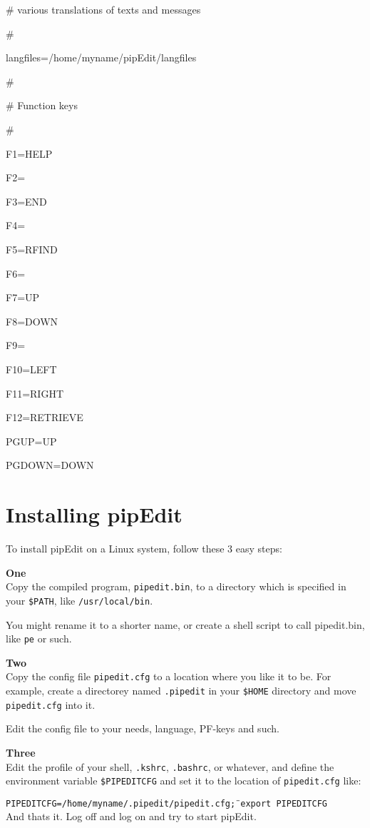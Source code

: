 \documentclass{report}
\begin{document}
\# various translations of texts and messages

\#

langfiles=/home/myname/pipEdit/langfiles

\#

\# Function keys

\#

F1=HELP

F2=

F3=END

F4=

F5=RFIND

F6=

F7=UP

F8=DOWN

F9=

F10=LEFT

F11=RIGHT

F12=RETRIEVE

PGUP=UP

PGDOWN=DOWN

\chapter{Installing pipEdit}
To install pipEdit on a Linux system, follow these 3 easy steps: \\
\break

\textbf{One} \\
Copy the compiled program, \texttt{pipedit.bin}, to a directory which is 
specified in your \texttt{\$PATH}, like \texttt{/usr/local/bin}.

You might rename it to a shorter name, or create a shell script to call pipedit.bin, like \texttt{pe} or such. \\
\break

\textbf{Two} \\
Copy the config file \texttt{pipedit.cfg} to a location where you like it to be.
For example, create a directorey named \texttt{.pipedit} in your 
\texttt{\$HOME} directory and move \texttt{pipedit.cfg} into it.

Edit the config file to your needs, language, PF-keys and such.
\\
\break

\textbf{Three} \\
Edit the profile of your shell, \texttt{.kshrc}, \texttt{.bashrc}, or whatever, 
and define
the environment variable \texttt{\$PIPEDITCFG} and set it to the location of
\texttt{pipedit.cfg} like:

\texttt{PIPEDITCFG=\"/home/myname/.pipedit/pipedit.cfg\" ; export PIPEDITCFG}
\\
\break
And thats it. Log off and log on and try to start pipEdit.
\end{document}
